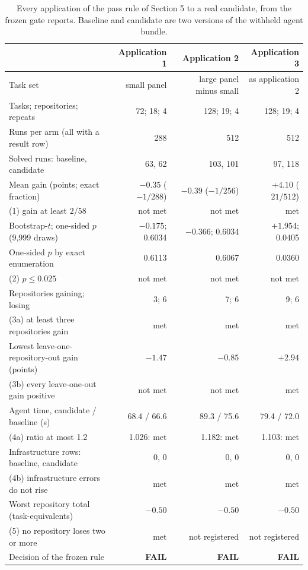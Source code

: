 \begin{table}[!htb]
\centering
\caption{Every application of the pass rule of Section 5 to a real candidate, from the frozen gate reports. Baseline and candidate are two versions of the withheld agent bundle.}\label{tab:s-gates}
\footnotesize
\begin{tabular}{lrrr}
\toprule
 & Application 1 & Application 2 & Application 3 \\
\midrule
Task set & small panel & large panel minus small & as application 2 \\
Tasks; repositories; repeats & 72; 18; 4 & 128; 19; 4 & 128; 19; 4 \\
Runs per arm (all with a result row) & 288 & 512 & 512 \\
Solved runs: baseline, candidate & 63, 62 & 103, 101 & 97, 118 \\
Mean gain (points; exact fraction) & ${-}0.35$ (${-}1/288$) & ${-}0.39$ (${-}1/256$) & ${+}4.10$ ($21/512$) \\
\quad (1) gain at least $2/58$ & not met & not met & met \\
Bootstrap-$t$; one-sided $p$ (9{,}999 draws) & ${-}0.175$; 0.6034 & ${-}0.366$; 0.6034 & ${+}1.954$; 0.0405 \\
One-sided $p$ by exact enumeration & 0.6113 & 0.6067 & 0.0360 \\
\quad (2) $p \le 0.025$ & not met & not met & not met \\
Repositories gaining; losing & 3; 6 & 7; 6 & 9; 6 \\
\quad (3a) at least three repositories gain & met & met & met \\
Lowest leave-one-repository-out gain (points) & ${-}1.47$ & ${-}0.85$ & ${+}2.94$ \\
\quad (3b) every leave-one-out gain positive & not met & not met & met \\
Agent time, candidate / baseline (s) & 68.4 / 66.6 & 89.3 / 75.6 & 79.4 / 72.0 \\
\quad (4a) ratio at most 1.2 & 1.026: met & 1.182: met & 1.103: met \\
Infrastructure rows: baseline, candidate & 0, 0 & 0, 0 & 0, 0 \\
\quad (4b) infrastructure errors do not rise & met & met & met \\
Worst repository total (task-equivalents) & ${-}0.50$ & ${-}0.50$ & ${-}0.50$ \\
\quad (5) no repository loses two or more & met & not registered & not registered \\
\midrule
Decision of the frozen rule & \textbf{FAIL} & \textbf{FAIL} & \textbf{FAIL} \\
\bottomrule
\end{tabular}
\end{table}
